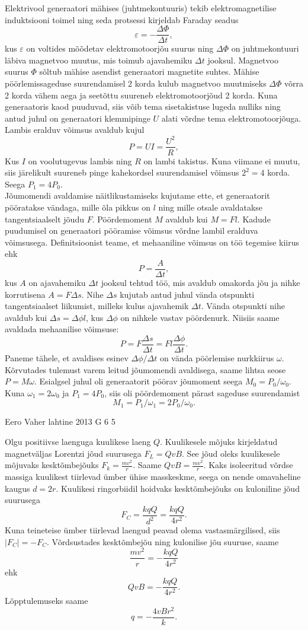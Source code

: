 \documentclass[11pt]{article}
\begin{document}
{{\ifSolution
\osa Elektrivool generaatori mähises (juhtmekontuuris) tekib elektromagnetilise induktsiooni toimel ning seda protsessi kirjeldab Faraday seadus
$$
\varepsilon = -\frac{\Delta\Phi}{\Delta t},
$$
kus $\varepsilon$ on voltides mõõdetav elektromotoorjõu suurus ning $\Delta\Phi$ on juhtmekontuuri läbiva magnetvoo muutus, mis toimub ajavahemiku $\Delta t$ jooksul. Magnetvoo suurus $\Phi$ sõltub mähise asendist generaatori magnetite suhtes. Mähise pöörlemissageduse suurendamisel 2 korda kulub magnetvoo muutmiseks $\Delta\Phi$ võrra 2 korda vähem aega ja seetõttu suureneb elektromotoorjõud 2 korda. Kuna generaatoris kaod puuduvad, siis võib tema sisetakistuse lugeda nulliks ning antud juhul on generaatori klemmipinge $U$ alati võrdne tema elektromotoorjõuga. Lambis eralduv võimsus avaldub kujul
$$
P = UI = \frac{U^2}{R},
$$
Kus $I$ on voolutugevus lambis ning $R$ on lambi takistus. Kuna viimane ei muutu, siis järelikult suureneb pinge kahekordsel suurendamisel võimsus $2^2=4$ korda. Seega $P_1=4P_0$.\\
\osa Jõumomendi avaldamise näitlikustamiseks kujutame ette, et generaatorit pööratakse vändaga, mille õla pikkus on $l$ ning mille otsale avaldatakse tangentsiaalselt jõudu $F$. Pöördemoment $M$ avaldub kui $M=Fl$. Kadude puudumisel on generaatori pööramise võimsus võrdne lambil eralduva võimsusega. Definitsioonist teame, et mehaaniline võimsus on töö tegemise kiirus ehk
$$
P = \frac{A}{\Delta t},
$$
kus $A$ on ajavahemiku $\Delta t$ jooksul tehtud töö, mis avaldub omakorda jõu ja nihke korrutisena $A=F \Delta s$. Nihe $\Delta s$ kujutab antud juhul vända otspunkti tangentsiaalset liikumist, milleks kulus ajavahemik $\Delta t$. Vända otspunkti nihe avaldub kui $\Delta s=\Delta\phi l$, kus $\Delta\phi$ on nihkele vastav pöördenurk. Niisiis saame avaldada mehaanilise võimsuse:
$$
P = F \frac{\Delta s}{\Delta t} =Fl \frac{\Delta\phi}{\Delta t}.
$$
Paneme tähele, et avaldises esinev $\Delta\phi / \Delta t$ on vända pöörlemise nurkkiirus $\omega$. Kõrvutades tulemust varem leitud jõumomendi avaldisega, saame lihtsa seose $P=M\omega$. Esialgsel juhul oli generaatorit pöörav jõumoment seega
$M_0 = P_0/\omega_0$. Kuna $\omega_1=2\omega_0$ ja $P_1=4P_0$, siis oli pöördemoment pärast sageduse suurendamist
\[
M_1 = P_1/\omega_1=2P_0/\omega_0.
\]
\fi
}

{Eero Vaher} %
{lahtine} %
{2013} %
{G 6} %
{5} %
{

\ifSolution
Olgu positiivse laenguga kuulikese laeng $Q$. Kuulikesele mõjuks kirjeldatud magnetväljas Lorentzi jõud suurusega $F_L=QvB$. See jõud oleks kuulikesele mõjuvaks kesktõmbejõuks $F_k=\frac{mv^2}{r}$. Saame $QvB=\frac{mv^2}{r}$. Kaks isoleeritud võrdse massiga kuulikest tiirlevad ümber ühise masskeskme, seega on nende omavaheline kaugus $d=2r$. Kuulikesi ringorbiidil hoidvaks kesktõmbejõuks on kuloniline jõud suurusega 
\[
F_C=\frac{kqQ}{d^2}=\frac{kqQ}{4r^2}.
\]
Kuna teineteise ümber tiirlevad laengud peavad olema vastasmärgilised, siis $|F_C|=-F_C$. Võrdsustades kesktõmbejõu ning kulonilise jõu suuruse, saame
\[
\frac{mv^2}{r}=-\frac{kqQ}{4r^2}
\]
ehk
\[
QvB=-\frac{kqQ}{4r^2}.
\]
Lõpptulemuseks saame 
\[
q=-\frac{4vBr^2}{k}.
\]
\fi
}

}
\end{document}
